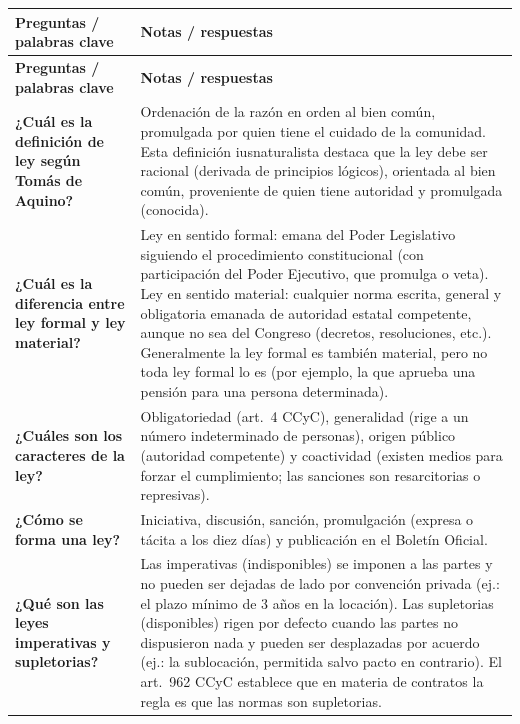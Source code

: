 \documentclass[12pt,oneside]{book}
\begin{document}
\begin{longtable}{@{}>{\raggedright\arraybackslash}p{} >{\raggedright\arraybackslash}p{}@{}}
\toprule
\textbf{Preguntas / palabras clave} & \textbf{Notas / respuestas} \\
\midrule
\endfirsthead
\toprule
\textbf{Preguntas / palabras clave} & \textbf{Notas / respuestas} \\
\midrule
\endhead
\bottomrule
\endfoot

\textbf{¿Cuál es la definición de ley según Tomás de Aquino?} &
Ordenación de la razón en orden al bien común, promulgada por quien tiene el cuidado de la comunidad. Esta definición iusnaturalista destaca que la ley debe ser racional (derivada de principios lógicos), orientada al bien común, proveniente de quien tiene autoridad y promulgada (conocida). \\[4pt]

\textbf{¿Cuál es la diferencia entre ley formal y ley material?} &
Ley en sentido formal: emana del Poder Legislativo siguiendo el procedimiento constitucional (con participación del Poder Ejecutivo, que promulga o veta). Ley en sentido material: cualquier norma escrita, general y obligatoria emanada de autoridad estatal competente, aunque no sea del Congreso (decretos, resoluciones, etc.). Generalmente la ley formal es también material, pero no toda ley formal lo es (por ejemplo, la que aprueba una pensión para una persona determinada). \\[4pt]

\textbf{¿Cuáles son los caracteres de la ley?} &
Obligatoriedad (art.~4 CCyC), generalidad (rige a un número indeterminado de personas), origen público (autoridad competente) y coactividad (existen medios para forzar el cumplimiento; las sanciones son resarcitorias o represivas). \\[4pt]

\textbf{¿Cómo se forma una ley?} &
Iniciativa, discusión, sanción, promulgación (expresa o tácita a los diez días) y publicación en el Boletín Oficial. \\[4pt]

\textbf{¿Qué son las leyes imperativas y supletorias?} &
Las imperativas (indisponibles) se imponen a las partes y no pueden ser dejadas de lado por convención privada (ej.: el plazo mínimo de 3 años en la locación). Las supletorias (disponibles) rigen por defecto cuando las partes no dispusieron nada y pueden ser desplazadas por acuerdo (ej.: la sublocación, permitida salvo pacto en contrario). El art.~962 CCyC establece que en materia de contratos la regla es que las normas son supletorias. \\[4pt]


\end{longtable}
\end{document}
